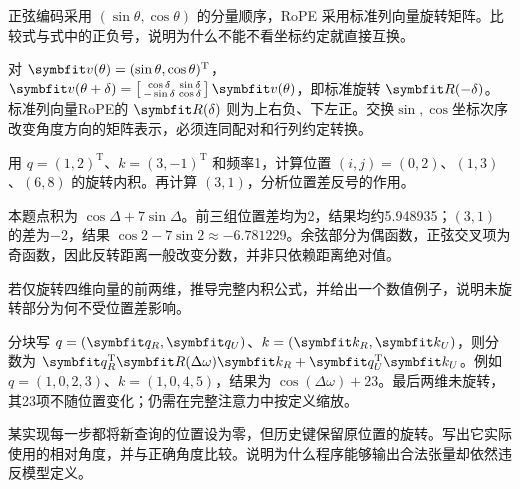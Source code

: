 \begin{exercises}
\begin{exercise}\optional 正弦编码采用 $(\sin\theta,\cos\theta)$ 的分量顺序，RoPE 采用标准列向量旋转矩阵。比较式与式中的正负号，说明为什么不能不看坐标约定就直接互换。

\begin{solution}
对 $\vect{v}(\theta)=(\sin\theta,\cos\theta)^{\mathrm{T}}$，$\vect{v}(\theta+\delta)=\left[\begin{smallmatrix}\cos\delta&\sin\delta\\-\sin\delta&\cos\delta\end{smallmatrix}\right]\vect{v}(\theta)$，即标准旋转 $\mat{R}(-\delta)$。标准列向量RoPE的 $\mat{R}(\delta)$ 则为上右负、下左正。交换$\sin,\cos$坐标次序改变角度方向的矩阵表示，必须连同配对和行列约定转换。
\end{solution}
\end{exercise}

\begin{exercise} 用 $q=(1,2)^{\mathrm{T}}$、$k=(3,-1)^{\mathrm{T}}$ 和频率1，计算位置 $(i,j)=(0,2)$、$(1,3)$、$(6,8)$ 的旋转内积。再计算 $(3,1)$，分析位置差反号的作用。

\begin{solution}
本题点积为 $\cos\Delta+7\sin\Delta$。前三组位置差均为2，结果均约5.948935；$(3,1)$ 的差为−2，结果 $\cos2-7\sin2\approx-6.781229$。余弦部分为偶函数，正弦交叉项为奇函数，因此反转距离一般改变分数，并非只依赖距离绝对值。
\end{solution}
\end{exercise}

\begin{exercise}\optional 若仅旋转四维向量的前两维，推导完整内积公式，并给出一个数值例子，说明未旋转部分为何不受位置差影响。

\begin{solution}
分块写 $q=(\vect{q}_R,\vect{q}_U)$、$k=(\vect{k}_R,\vect{k}_U)$，则分数为 $\vect{q}_R^{\mathrm{T}}\mat{R}(\Delta\omega)\vect{k}_R+\vect{q}_U^{\mathrm{T}}\vect{k}_U$。例如 $q=(1,0,2,3)$、$k=(1,0,4,5)$，结果为 $\cos(\Delta\omega)+23$。最后两维未旋转，其23项不随位置变化；仍需在完整注意力中按定义缩放。
\end{solution}
\end{exercise}

\begin{exercise} 某实现每一步都将新查询的位置设为零，但历史键保留原位置的旋转。写出它实际使用的相对角度，并与正确角度比较。说明为什么程序能够输出合法张量却依然违反模型定义。


\end{exercise}
\end{exercises}
